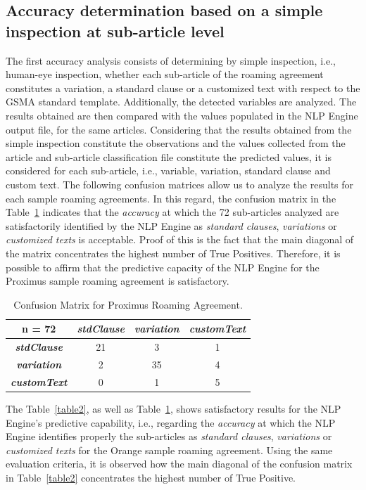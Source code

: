 \documentclass[conference]{style/IEEEtran}
\begin{document}
\subsection{Accuracy determination based on a simple inspection at sub-article level}
The first accuracy analysis consists of determining by simple inspection, i.e., human-eye inspection, whether each sub-article of the roaming agreement constitutes a variation, a standard clause or a customized text with respect to the GSMA standard template. Additionally, the detected variables are analyzed. The results obtained are then compared with the values populated in the NLP Engine output file, for the same articles. Considering that the results obtained from the simple inspection constitute the observations and the values collected from the article and sub-article classification file constitute the predicted values, it is considered for each sub-article, i.e., variable, variation, standard clause and custom text. The following confusion matrices allow us to analyze the results for each sample roaming agreements. In this regard, the confusion matrix in the Table~\ref{table1} indicates that the \textit{accuracy} at which the 72 sub-articles analyzed are satisfactorily identified by the NLP Engine as \textit{standard clauses}, \textit{variations} or \textit{customized texts} is acceptable. Proof of this is the fact that the main diagonal of the matrix concentrates the highest number of True Positives. Therefore, it is possible to affirm that the predictive capacity of the NLP Engine for the Proximus sample roaming agreement is satisfactory. 

\begin{table}[htbp]
\caption{Confusion Matrix for Proximus Roaming Agreement.}
\begin{center}
\begin{tabular}{|c|c|c|c|}
\hline
\textbf{n = 72} & \textbf{\textit{stdClause}}& \textbf{\textit{variation}}& \textbf{\textit{customText}} \\
\hline
\textbf{\textit{stdClause}}& 21 & 3 & 1 \\
\hline
\textbf{\textit{variation}}& 2 & 35 & 4 \\
\hline
\textbf{\textit{customText}}& 0 & 1 & 5 \\
\hline
\end{tabular}
\label{table1}
\end{center}
\end{table}

The Table~\ref{table2}, as well as Table~\ref{table1}, shows satisfactory results for the NLP Engine's predictive capability, i.e., regarding the \textit{accuracy} at which the NLP Engine identifies properly the sub-articles as \textit{standard clauses}, \textit{variations} or \textit{customized texts} for the Orange sample roaming agreement. Using the same evaluation criteria, it is observed how the main diagonal of the confusion matrix in Table~\ref{table2} concentrates the highest number of True Positive.
\end{document}
